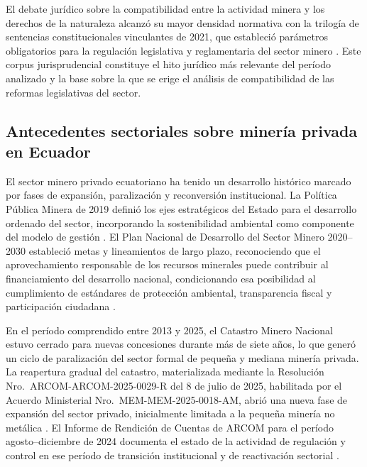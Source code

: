 El debate jurídico sobre la compatibilidad entre la actividad minera y los derechos de la naturaleza alcanzó su mayor densidad normativa con la trilogía de sentencias constitucionales vinculantes de 2021, que estableció parámetros obligatorios para la regulación legislativa y reglamentaria del sector minero \parencite{cce_32_17_in_21,cce_22_18_in_21,cce_1149_19_jp_21}. Este corpus jurisprudencial constituye el hito jurídico más relevante del período analizado y la base sobre la que se erige el análisis de compatibilidad de las reformas legislativas del sector.

\subsection{Antecedentes sectoriales sobre minería privada en Ecuador}

El sector minero privado ecuatoriano ha tenido un desarrollo histórico marcado por fases de expansión, paralización y reconversión institucional. La Política Pública Minera de 2019 definió los ejes estratégicos del Estado para el desarrollo ordenado del sector, incorporando la sostenibilidad ambiental como componente del modelo de gestión \parencite{politica_publica_minera_2019}. El Plan Nacional de Desarrollo del Sector Minero 2020--2030 estableció metas y lineamientos de largo plazo, reconociendo que el aprovechamiento responsable de los recursos minerales puede contribuir al financiamiento del desarrollo nacional, condicionando esa posibilidad al cumplimiento de estándares de protección ambiental, transparencia fiscal y participación ciudadana \parencite{plan_nacional_sector_minero_2020}.

En el período comprendido entre 2013 y 2025, el Catastro Minero Nacional estuvo cerrado para nuevas concesiones durante más de siete años, lo que generó un ciclo de paralización del sector formal de pequeña y mediana minería privada. La reapertura gradual del catastro, materializada mediante la Resolución Nro.\ ARCOM-ARCOM-2025-0029-R del 8 de julio de 2025, habilitada por el Acuerdo Ministerial Nro.\ MEM-MEM-2025-0018-AM, abrió una nueva fase de expansión del sector privado, inicialmente limitada a la pequeña minería no metálica \parencite{arcom_resolucion_0029_2025}. El Informe de Rendición de Cuentas de ARCOM para el período agosto--diciembre de 2024 documenta el estado de la actividad de regulación y control en ese período de transición institucional y de reactivación sectorial \parencite{arcom_rendicion_cuentas_2024}.

